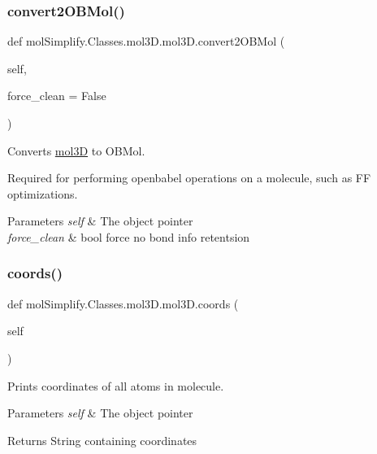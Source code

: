 \subsubsection{\texorpdfstring{convert2\+O\+B\+Mol()}{convert2OBMol()}}
{\footnotesize\ttfamily def mol\+Simplify.\+Classes.\+mol3\+D.\+mol3\+D.\+convert2\+O\+B\+Mol (\begin{DoxyParamCaption}\item[{}]{self,  }\item[{}]{force\+\_\+clean = {\ttfamily False} }\end{DoxyParamCaption})}



Converts \hyperlink{classmolSimplify_1_1Classes_1_1mol3D_1_1mol3D}{mol3D} to O\+B\+Mol. 

Required for performing openbabel operations on a molecule, such as FF optimizations. 
\begin{DoxyParams}{Parameters}
{\em self} & The object pointer \\
\hline
{\em force\+\_\+clean} & bool force no bond info retentsion \\
\hline
\end{DoxyParams}
\mbox{\label{classmolSimplify_1_1Classes_1_1mol3D_1_1mol3D_a551393e5c2417086b3b7855be3cf5957}} 
\subsubsection{\texorpdfstring{coords()}{coords()}}
{\footnotesize\ttfamily def mol\+Simplify.\+Classes.\+mol3\+D.\+mol3\+D.\+coords (\begin{DoxyParamCaption}\item[{}]{self }\end{DoxyParamCaption})}



Prints coordinates of all atoms in molecule. 


\begin{DoxyParams}{Parameters}
{\em self} & The object pointer \\
\hline
\end{DoxyParams}
\begin{DoxyReturn}{Returns}
String containing coordinates 
\end{DoxyReturn}
\mbox{\label{classmolSimplify_1_1Classes_1_1mol3D_1_1mol3D_a305748724bd9be10c324302f046e3815}} 
